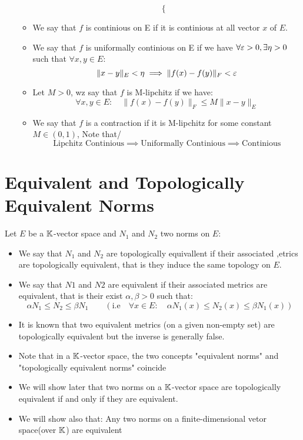 \begin{enumerate}
\begin{itemize}
\[\begin{cases}
				\end{cases}
			\]
			\item We say that $f$ is continious on E if it is continious at all vector $x$ of $E$.
			\item We say that $f$ is uniformally continious on E if we have $\forall \varepsilon >0, \exists \eta >0$ such that
				$\forall x,y \in E$:
				\[
				\| x-y \| _{E} < \eta \implies \| f(x) - f(y)  \| _{F} < \varepsilon 
				\]
			\item Let $M>0$, wz say that $f$ is M-lipchitz if we have:
				\[
					\forall x,y \in E: \quad \| f(x)  - f(y) \|_{F} \leq M\| x-y \| _{E}
				\]
			\item We say that $f$ is a contraction if it is M-lipchitz for some constant $M \in (0,1)$, Note that/
				\[
				\text{Lipchitz Continious} \implies \text{Uniformally Continious} \implies \text{Continious}   
				\]
		\end{itemize}
	\end{enumerate}

	\section{Equivalent and Topologically Equivalent Norms}
	\begin{definition}[]
		Let $E$ be a $\mathbb{K}$-vector space and $N_1$ and $N_2$ two norms on $E$:
		\begin{itemize}
			\item We say that $N_1$ and $N_2$ are topologically equivallent if their associated ,etrics are topologically 
				equivalent, that is they induce the same topology on $E$.
			\item We say that $N1$ and $N2$  are equivalent if their associated metrics are equivalent, that is their exist
				$ \alpha,\beta>0$ such that:
				\[
					\alpha N_1 \leq N_2 \leq \beta N_1 \quad  \quad 
					(\text{i.e} \quad \forall x \in  E: \quad \alpha N_1(x)  \leq N_2(x)  \leq \beta N_1(x)  ) 
				\]
		\end{itemize}
	\end{definition}
	\begin{remark}[]
		\begin{itemize}
			\item   It is known that two equivalent metrics (on a given non-empty set) are topologically equivalent 
				but the inverse is generally false.
			\item  Note that in a $\mathbb{K}$-vector space, the two concepts "equivalent norms" and "topologically
				equivalent norms" coincide   
			\item  We will show later that two norms on a $\mathbb{K}$-vector space are topologically equivalent if and only if
				they are equivalent. 
			\item We will show also that: Any two norms on a finite-dimensional vetor space(over $\mathbb{K}$) are  equivalent  
		\end{itemize}
	\end{remark}
% 


